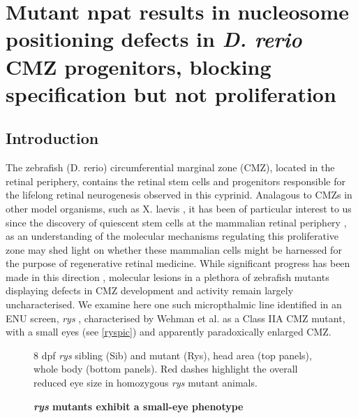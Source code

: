\chapter{Mutant npat results in nucleosome positioning defects in \textit{D. rerio} CMZ progenitors, blocking specification but not proliferation}
\label{chap:rys}
\section{Introduction}
The zebrafish (D. rerio) circumferential marginal zone (CMZ), located in the retinal periphery, contains the retinal stem cells and progenitors responsible for the lifelong retinal neurogenesis observed in this cyprinid. Analagous to CMZs in other model organisms, such as X. laevis \cite{Perron1998}, it has been of particular interest to us since the discovery of quiescent stem cells at the mammalian retinal periphery \cite{Tropepe2000}, as an understanding of the molecular mechanisms regulating this proliferative zone may shed light on whether these mammalian cells might be harnessed for the purpose of regenerative retinal medicine. While significant progress has been made in this direction \cite{Raymond2006}, molecular lesions in a plethora of zebrafish mutants displaying defects in CMZ development and activity remain largely uncharacterised. We examine here one such micropthalmic line identified in an ENU screen, \textit{rys} \cite{Wehman2005}, characterised by Wehman et al. as a Class IIA CMZ mutant, with a small eyes (see \autoref{ryspic}) and apparently paradoxically enlarged CMZ.

\begin{figure}[!h]
    \caption{{\bf \textit{rys} mutants exhibit a small-eye phenotype}}
    \label{ryspic}
    8 dpf \textit{rys} sibling (Sib) and mutant (Rys), head area (top panels), whole body (bottom panels). Red dashes highlight the overall reduced eye size in homozygous \textit{rys} mutant animals.
\end{figure}

